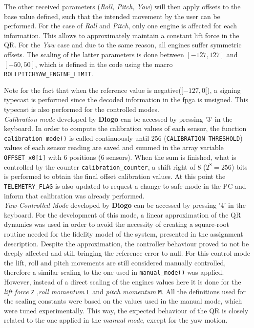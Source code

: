 \documentclass{article}
\begin{document}
The other received parameters (\textit{Roll, Pitch, Yaw}) will then apply offsets to the base value defined, such that the intended movement by the user can be performed. For the case of \textit{Roll} and \textit{Pitch}, only one engine is affected for each information. This allows to approximately maintain a constant lift force in the QR. For the \textit{Yaw} case and due to the same reason, all engines suffer symmetric offsets. The scaling of the latter parameters is done between $[-127,127]$ and $[-50,50]$, which is defined in the code using the macro \texttt{ROLLPITCHYAW\_ENGINE\_LIMIT}. 

Note for the fact that when the reference value is negative($[-127,0[$), a signing typecast is performed since the decoded information in the fpga is unsigned. This typecast is also performed for the controlled modes.\\

\textit{Calibration mode} developed by \textbf{Diogo} can be accessed by pressing '$3$' in the keyboard. In order to compute the calibration values of each sensor, the function \texttt{calibration\_mode()} is called continuously until 256 (\texttt{CALIBRATION\_THRESHOLD}) values of each sensor reading are saved and summed in the array variable \texttt{OFFSET\_x0[i]} with 6 positions (6 sensors). When the sum is finished, what is controlled by the counter \texttt{calibration\_counter}, a shift right of $8$ ($2^8=256$) bits is performed to obtain the final offset calibration values. At this point the \texttt{TELEMETRY\_FLAG} is also updated to request a change to safe mode in the PC and inform that calibration was already performed.\\

\textit{Yaw-Controlled Mode} developed by \textbf{Diogo} can be accessed by pressing '$4$' in the keyboard. For the development of this mode, a linear approximation of the QR dynamics was used in order to avoid the necessity of creating a square-root routine needed for the fidelity model of the system, presented in the assignment description. Despite the approximation, the controller behaviour proved to not be deeply affected and still bringing the reference error to null.
For this control mode the lift, roll and pitch movements are still considered manually controlled, therefore a similar scaling to the one used in \texttt{manual\_mode()} was applied. However, instead of a direct scaling of the engines values here it is done for the \textit{lift force} \texttt{Z} ,\textit{roll momentum} \texttt{L} and \textit{pitch momentum} \texttt{M}. All the definitions used for the scaling constants were based on the values used in the manual mode, which were tuned experimentally. This way, the expected behaviour of the QR is closely related to the one applied in the \textit{manual mode}, except for the yaw motion.
\end{document}
